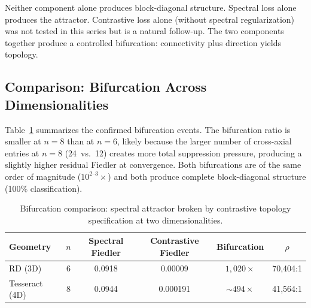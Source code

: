 Neither component alone produces block-diagonal structure. Spectral
loss alone produces the attractor. Contrastive loss alone (without
spectral regularization) was not tested in this series but is a
natural follow-up. The two components together produce a controlled
bifurcation: connectivity plus direction yields topology.

\subsection{Comparison: Bifurcation Across Dimensionalities}

Table~\ref{tab:bifurcation} summarizes the confirmed bifurcation
events. The bifurcation ratio is smaller at $n = 8$ than at $n = 6$,
likely because the larger number of cross-axial entries at $n = 8$
(24~vs.~12) creates more total suppression pressure, producing a
slightly higher residual Fiedler at convergence. Both bifurcations
are of the same order of magnitude ($10^{2\text{--}3}\times$) and
both produce complete block-diagonal structure (100\% classification).

\begin{table}[H]
\centering
\caption{Bifurcation comparison: spectral attractor broken by
  contrastive topology specification at two dimensionalities.}
\label{tab:bifurcation}
\small
\begin{tabular}{lccccc}
\toprule
Geometry & $n$ & Spectral Fiedler & Contrastive Fiedler & Bifurcation & $\rho$ \\
\midrule
RD (3D)       & 6 & 0.0918 & 0.00009  & $1{,}020\times$ & 70{,}404:1 \\
Tesseract (4D) & 8 & 0.0944 & 0.000191 & ${\sim}494\times$  & 41{,}564:1 \\
\bottomrule
\end{tabular}
\end{table}
